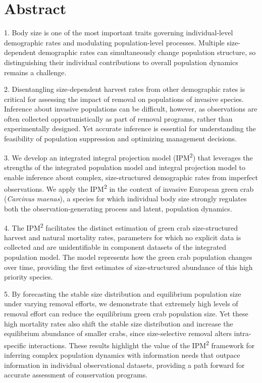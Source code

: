 \documentclass{article}
\begin{document}
\doublespacing

\linenumbers

\section{Abstract}

1.	Body size is one of the most important traits governing individual-level demographic rates and modulating population-level processes. Multiple size-dependent demographic rates can simultaneously change population structure, so distinguishing their individual contributions to overall population dynamics remains a challenge.

2.	Disentangling size-dependent harvest rates from other demographic rates is critical for assessing the impact of removal on populations of invasive species. Inference about invasive populations can be difficult, however, as observations are often collected opportunistically as part of removal programs, rather than experimentally designed. Yet accurate inference is essential for understanding the feasibility of population suppression and optimizing management decisions.

3.	We develop an integrated integral projection model (IPM\textsuperscript{2}) that leverages the strengths of the integrated population model and integral projection model to enable inference about complex, size-structured demographic rates from imperfect observations. We apply the IPM\textsuperscript{2} in the context of invasive European green crab (\textit{Carcinus maenas}), a species for which individual body size strongly regulates both the observation-generating process and latent, population dynamics.

4.	The IPM\textsuperscript{2} facilitates the distinct estimation of green crab size-structured harvest and natural mortality rates, parameters for which no explicit data is collected and are unidentifiable in component datasets of the integrated population model. The model represents how the green crab population changes over time, providing the first estimates of size-structured abundance of this high priority species. 

5.	By forecasting the stable size distribution and equilibrium population size under varying removal efforts, we demonstrate that extremely high levels of removal effort can reduce the equilibrium green crab population size. Yet these high mortality rates also shift the stable size distribution and increase the equilibrium abundance of smaller crabs, since size-selective removal alters intra-specific interactions. These results highlight the value of the IPM\textsuperscript{2} framework for inferring complex population dynamics with information needs that outpace information in individual observational datasets, providing a path forward for accurate assessment of conservation programs.
\end{document}
